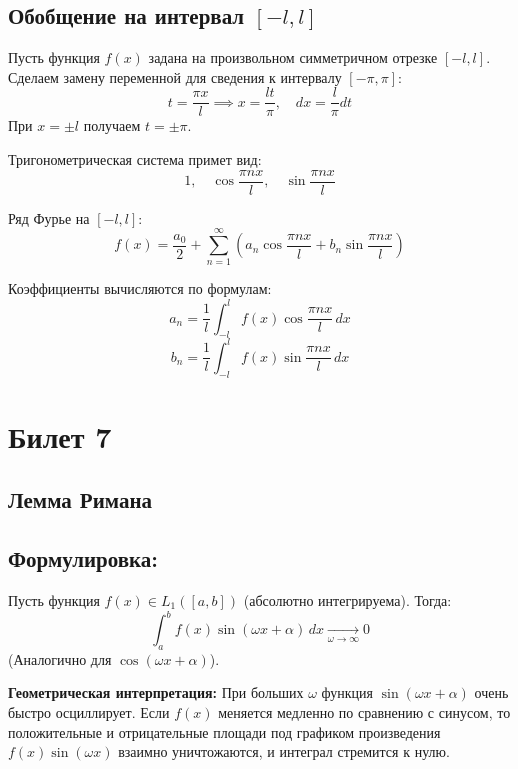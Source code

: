 \documentclass[12pt,a4paper,openany]{book}
\begin{document}
\section{Обобщение на интервал $[-l, l]$}

Пусть функция $f(x)$ задана на произвольном симметричном отрезке $[-l, l]$.
Сделаем замену переменной для сведения к интервалу $[-\pi, \pi]$:
$$
t = \frac{\pi x}{l} \implies x = \frac{l t}{\pi}, \quad dx = \frac{l}{\pi} dt
$$
При $x = \pm l$ получаем $t = \pm \pi$.

Тригонометрическая система примет вид:
$$
1, \quad \cos \frac{\pi n x}{l}, \quad \sin \frac{\pi n x}{l}
$$

Ряд Фурье на $[-l, l]$:
$$
f(x) = \frac{a_0}{2} + \sum_{n=1}^{\infty} \left( a_n \cos \frac{\pi n x}{l} + b_n \sin \frac{\pi n x}{l} \right)
$$

Коэффициенты вычисляются по формулам:
$$
a_n = \frac{1}{l} \int_{-l}^{l} f(x) \cos \frac{\pi n x}{l} \, dx
$$
$$
b_n = \frac{1}{l} \int_{-l}^{l} f(x) \sin \frac{\pi n x}{l} \, dx
$$
\chapter{Билет 7}
\section{Лемма Римана}

\section{Формулировка:}
Пусть функция $f(x) \in L_1([a, b])$ (абсолютно интегрируема).
Тогда:
$$ \int_a^b f(x) \sin(\omega x + \alpha) \, dx \xrightarrow[\omega \to \infty]{} 0 $$
(Аналогично для $\cos(\omega x + \alpha)$).

\vspace{0.5cm}

\textbf{Геометрическая интерпретация:}
При больших $\omega$ функция $\sin(\omega x + \alpha)$ очень быстро осциллирует. Если $f(x)$ меняется медленно по сравнению с синусом, то положительные и отрицательные площади под графиком произведения $f(x) \sin(\omega x)$ взаимно уничтожаются, и интеграл стремится к нулю.

\begin{center}
\end{center}
\end{document}
